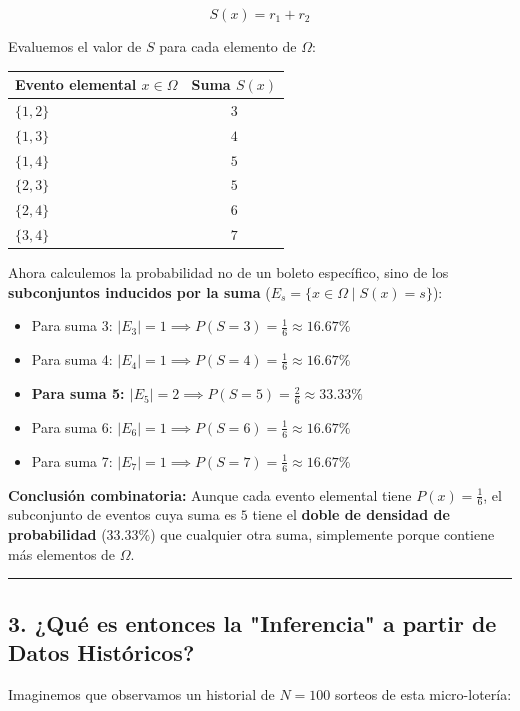 \documentclass[11pt,a4paper]{article}
\begin{document}
$$S(x) = r_1 + r_2$$

Evaluemos el valor de $S$ para cada elemento de $\Omega$:

\begin{center}
\begin{tabular}{lc}
\toprule
\textbf{Evento elemental $x \in \Omega$} & \textbf{Suma $S(x)$} \\
\midrule
$\{1, 2\}$ & $3$ \\
$\{1, 3\}$ & $4$ \\
$\{1, 4\}$ & $5$ \\
$\{2, 3\}$ & $5$ \\
$\{2, 4\}$ & $6$ \\
$\{3, 4\}$ & $7$ \\
\bottomrule
\end{tabular}
\end{center}

Ahora calculemos la probabilidad no de un boleto específico, sino de los \textbf{subconjuntos inducidos por la suma} ($E_s = \{x \in \Omega \mid S(x) = s\}$):

\begin{itemize}
    \item Para suma 3: $|E_3| = 1 \implies P(S=3) = \frac{1}{6} \approx 16.67\%$
    \item Para suma 4: $|E_4| = 1 \implies P(S=4) = \frac{1}{6} \approx 16.67\%$
    \item \textbf{Para suma 5: $|E_5| = 2 \implies P(S=5) = \frac{2}{6} \approx 33.33\%$}
    \item Para suma 6: $|E_6| = 1 \implies P(S=6) = \frac{1}{6} \approx 16.67\%$
    \item Para suma 7: $|E_7| = 1 \implies P(S=7) = \frac{1}{6} \approx 16.67\%$
\end{itemize}

\textbf{Conclusión combinatoria:} Aunque cada evento elemental tiene $P(x) = \frac{1}{6}$, el subconjunto de eventos cuya suma es $5$ tiene el \textbf{doble de densidad de probabilidad} ($33.33\%$) que cualquier otra suma, simplemente porque contiene más elementos de $\Omega$.

\medskip
\hrule
\medskip

\subsection*{3. ¿Qué es entonces la "Inferencia" a partir de Datos Históricos?}

Imaginemos que observamos un historial de $N = 100$ sorteos de esta micro-lotería:
\end{document}
